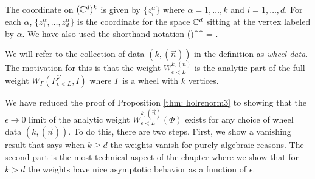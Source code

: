 \documentclass[11pt]{amsart}
\begin{document}
The coordinate on $(\mathbb C^{d})^k$ is given by $\{z_i^\alpha\}$ where $\alpha = 1,\ldots,k$ and $i = 1, \ldots, d$. 
For each $\alpha$, $\{z_1^\alpha, \ldots, z_d^\alpha\}$ is the coordinate for the space $\mathbb C^d$ sitting at the vertex labeled by $\alpha$. 
We have also used the shorthand notation
\ben
\left(\right)^{^\alpha} =  \cdots  {}.
\een

We will refer to the collection of data $(k, (\vec{n}))$ in the definition as {\em wheel data}.
The motivation for this is that the weight $W_{\epsilon < L}^{k, (n)}$ is the analytic part of the full weight $W_{\Gamma}(P^V_{\epsilon<L}, I)$ where $\Gamma$ is a wheel with $k$ vertices. 

We have reduced the proof of Proposition \ref{thm: holrenorm3} to showing that the $\epsilon \to 0$ limit of the analytic weight $W_{\epsilon < L}^{k, (\vec{n})}(\Phi)$ exists for any choice of wheel data $(k, (\vec{n}))$.
To do this, there are two steps. 
First, we show a vanishing result that says when $k \geq d$ the  weights vanish for purely algebraic reasons. 
The second part is the most technical aspect of the chapter where we show that for $k > d$ the weights have nice asymptotic behavior as a function of $\epsilon$.
\end{document}
